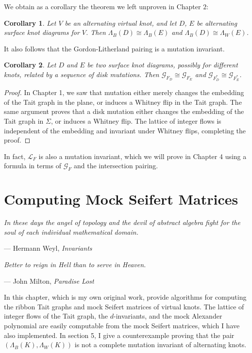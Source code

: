 \documentclass[12pt]{report}
\newtheorem*{corollary}{Corollary}
\theoremstyle{upright}
\begin{document}
We obtain as a corollary the theorem we left unproven in Chapter $2$:

\begin{corollary}
Let $V$ be an alternating virtual knot, and let $D$, $E$ be alternating surface knot diagrams for $V$. Then $\Lambda_{B}(D) \cong \Lambda_{B}(E)$ and $\Lambda_{B}(D) \cong \Lambda_{W}(E)$.
\end{corollary}

It also follows that the Gordon-Litherland pairing is a mutation invariant.

\begin{corollary}
	Let $D$ and $E$ be two surface knot diagrams, possibly for different knots, related by a sequence of disk mutations. Then $\mathcal{G}_{F_{D}} \cong \mathcal{G}_{F_{E}}$ and $\mathcal{G}_{F^{*}_{D}} \cong \mathcal{G}_{F^{*}_{E}}$.
\end{corollary}

\begin{proof}
	In Chapter 1, we saw that mutation either merely changes the embedding of the Tait graph in the plane, or induces a Whitney flip in the Tait graph. The same argument proves that a disk mutation either changes the embedding of the Tait graph in $\Sigma$, or induces a Whitney flip. The lattice of integer flows is independent of the embedding and invariant under Whitney flips, completing the proof.
\end{proof}

In fact, $\mathcal{L}_{F}$ is also a mutation invariant, which we will prove in Chapter 4 using a formula in terms of $\mathcal{G}_{F}$ and the intersection pairing.

\chapter{Computing Mock Seifert Matrices}

\epigraph{\itshape In these days the angel of topology and the devil of abstract algebra fight for the soul of each individual mathematical domain.}{--- Hermann Weyl, \textit{Invariants}}

\epigraph{\itshape Better to reign in Hell than to serve in Heaven.}{--- John Milton, \textit{Paradise Lost}}

In this chapter, which is my own original work,	provide algorithms for computing the ribbon Tait graphs and mock Seifert matrices of virtual knots. The lattice of integer flows of the Tait graph, the $d$-invariants, and the mock Alexander polynomial are easily computable from the mock Seifert matrices, which I have also implemented. In section 5, I give a counterexample proving that the pair $(\Lambda_{B}(K), \Lambda_{W}(K))$ is not a complete mutation invariant of alternating knots.
\end{document}
